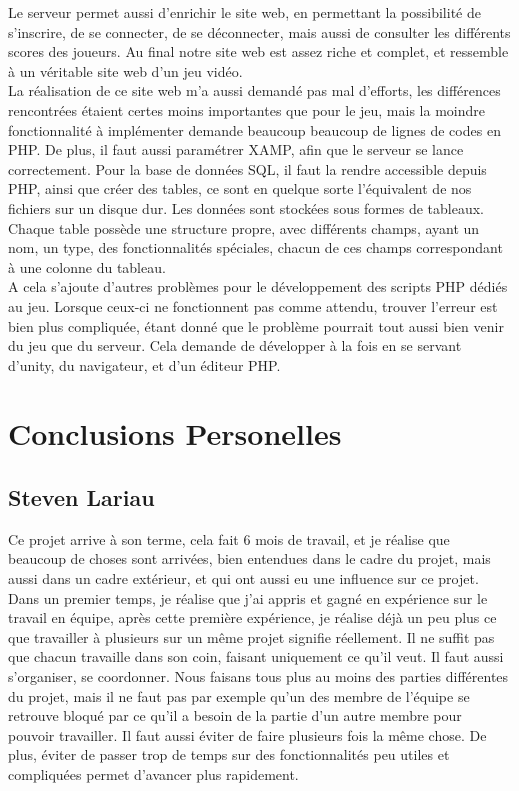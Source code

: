 \documentclass[12pt]{article}
\begin{document}
Le serveur permet aussi d'enrichir le site web, en permettant la possibilité de s'inscrire, de se connecter, de se déconnecter, mais aussi de consulter les différents scores des joueurs. Au final notre site web est assez riche et complet, et ressemble à un véritable site web d'un jeu vidéo.\\

La réalisation de ce site web m'a aussi demandé pas mal d'efforts, les différences rencontrées étaient certes moins importantes que pour le jeu, mais la moindre fonctionnalité à implémenter demande beaucoup beaucoup de lignes de codes en PHP. De plus, il faut aussi paramétrer XAMP, afin que le serveur se lance correctement. Pour la base de données SQL, il faut la rendre accessible depuis PHP, ainsi que créer des tables, ce sont en quelque sorte l'équivalent de nos fichiers sur un disque dur. Les données sont stockées sous formes de tableaux. Chaque table possède une structure propre, avec différents champs, ayant un nom, un type, des fonctionnalités spéciales, chacun de ces champs correspondant à une colonne du tableau.\\
A cela s'ajoute d'autres problèmes pour le développement des scripts PHP dédiés au jeu. Lorsque ceux-ci ne fonctionnent pas comme attendu, trouver l'erreur est bien plus compliquée, étant donné que le problème pourrait tout aussi bien venir du jeu que du serveur. Cela demande de développer à la fois en se servant d'unity, du navigateur, et d'un éditeur PHP.

\section{Conclusions Personelles}

\subsection{Steven Lariau}

Ce projet arrive à son terme, cela fait 6 mois de travail, et je réalise que beaucoup de choses sont arrivées, bien entendues dans le cadre du projet, mais aussi dans un cadre extérieur, et qui ont aussi eu une influence sur ce projet.\\
Dans un premier temps, je réalise que j'ai appris et gagné en expérience sur le travail en équipe, après cette première expérience, je réalise déjà un peu plus ce que travailler à plusieurs sur un même projet signifie réellement. Il ne suffit pas que chacun travaille dans son coin, faisant uniquement ce qu'il veut. Il faut aussi s'organiser, se coordonner. Nous faisans tous plus au moins des parties différentes du projet, mais il ne faut pas par exemple qu'un des membre de l'équipe se retrouve bloqué par ce qu'il a besoin de la partie d'un autre membre pour pouvoir travailler. Il faut aussi éviter de faire plusieurs fois la même chose. De plus, éviter de passer trop de temps sur des fonctionnalités peu utiles et compliquées permet d'avancer plus rapidement.\\
\end{document}
